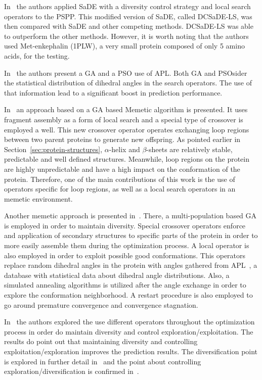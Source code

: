 In~\cite{sudha2015protein} the authors applied \ac{SaDE} with a diversity control
strategy and local search operators to the PSPP. This modified version of \ac{SaDE}, called DCSaDE-LS, was then compared with \ac{SaDE} and other competing methods. DCSaDE-LS was able to outperform the other methods. However, it is worth noting that the authors used Met-enkephalin (1PLW), a very small protein composed of only 5 amino acids, for the testing. 

In~\cite{borguesan2015apl} the authors present a \ac{GA} and a \ac{PSO} use
of \ac{APL}. Both \ac{GA} and \ac{PSO}sider the statistical distribution of
dihedral angles in the search operators. The use of that information lead to a
significant boost in prediction performance.

In~\cite{garza2016generating} an approach based on a GA based Memetic algorithm is presented. It uses fragment assembly as a form of local search and a special type of crossover is employed a well. This new crossover operator operates exchanging loop regions between two parent proteins to generate new offspring. As pointed earlier in Section~\ref{sec:protein-structures}, $\alpha$-helix and $\beta$-sheets are relatively stable, predictable and well defined structures. Meanwhile, loop regions on the protein are highly unpredictable and have a high impact on the conformation of the protein. Therefore, one of the main contributions of this work is the use of operators specific for loop regions, as well as a local search operators in an memetic environment.

Another memetic approach is presented in~\cite{correa2016memetic}. There, a multi-population
based \ac{GA} is employed in order to maintain diversity. Special crossover operators enforce
and application of secondary structures to specific parts of the protein in order
to more easily assemble them during the optimization process. A local operator is
also employed in order to exploit possible good conformations. This operators
replace random dihedral angles in the protein with angles gathered from
\ac{APL}~\cite{borguesan2015apl}, a database with statistical data about dihedral angle
distributions. Also, a simulated annealing algorithms is utilized after the angle
exchange in order to explore the conformation neighborhood. A restart procedure is also
employed to go around premature convergence and convergence stagnation.

In~\cite{narloch2017protein} the authors explored the use different operators
throughout the optimization process in order do maintain diversity and control
exploration/exploitation. The results do point out that maintaining diversity
and controlling exploitation/exploration improves the prediction results. 
The diversification point is explored in further detail in~\cite{narloch2016diversification}
and the point about controlling exploration/diversification is confirmed
in~\cite{simoncini2017balancing}.

